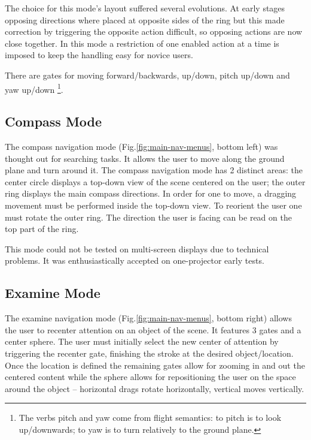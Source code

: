 The choice for this mode's layout suffered several evolutions.
At early stages opposing directions where placed at opposite sides of the ring but this
made correction by triggering the opposite action difficult, so opposing actions are now close together.
In this mode a restriction of one enabled action at a time is imposed to keep the handling easy for novice users.

There are gates for moving forward/backwards, up/down, pitch up/down and yaw up/down
\footnote{The verbs pitch and yaw come from flight semantics: to pitch is to look up/downwards; to yaw is to turn relatively to the ground plane.}.



\subsection{Compass Mode}

The compass navigation mode (Fig.\ref{fig:main-nav-menus}, bottom left) was thought out for searching tasks. It allows the user to move along the ground plane and turn around it.
The compass navigation mode has 2 distinct areas:
the center circle displays a top-down view of the scene centered on the user;
the outer ring displays the main compass directions.
In order for one to move, a dragging movement must be performed inside the top-down view.
To reorient the user one must rotate the outer ring. The direction the user is facing can be read on the top part of the ring.

This mode could not be tested on multi-screen displays due to technical problems.
It was enthusiastically accepted on one-projector early tests.


\subsection{Examine Mode}

The examine navigation mode (Fig.\ref{fig:main-nav-menus}, bottom right) allows the user to recenter attention on an object of the scene.
It features 3 gates and a center sphere.
The user must initially select the new center of attention by triggering the recenter gate,
finishing the stroke at the desired object/location.
Once the location is defined the remaining gates allow for zooming in and out the centered content
while the sphere allows for repositioning the user on the space around the object -- 
horizontal drags rotate horizontally, vertical moves vertically.

